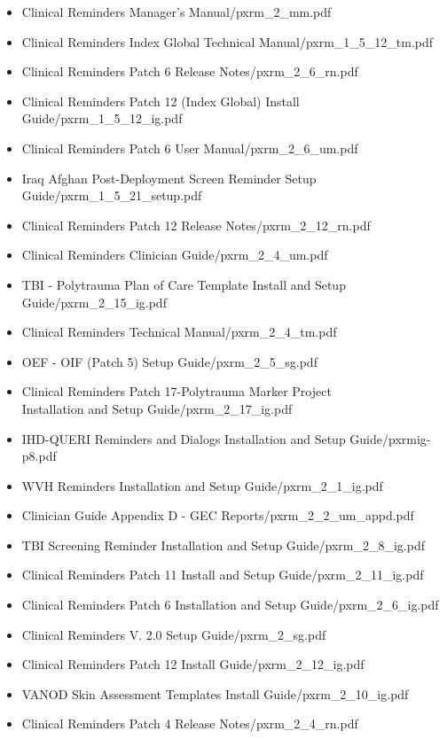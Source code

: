 \documentclass{OSEHRAArticle}
\begin{document}
\begin{itemize}
\item Clinical Reminders Manager's Manual/pxrm\_2\_mm.pdf
\item Clinical Reminders Index Global Technical Manual/pxrm\_1\_5\_12\_tm.pdf
\item Clinical Reminders Patch 6 Release Notes/pxrm\_2\_6\_rn.pdf
\item Clinical Reminders Patch 12 (Index Global) Install Guide/pxrm\_1\_5\_12\_ig.pdf
\item Clinical Reminders Patch 6 User Manual/pxrm\_2\_6\_um.pdf
\item Iraq  Afghan Post-Deployment Screen Reminder Setup Guide/pxrm\_1\_5\_21\_setup.pdf
\item Clinical Reminders Patch 12 Release Notes/pxrm\_2\_12\_rn.pdf
\item Clinical Reminders Clinician Guide/pxrm\_2\_4\_um.pdf
\item TBI - Polytrauma Plan of Care Template Install and Setup Guide/pxrm\_2\_15\_ig.pdf
\item Clinical Reminders Technical Manual/pxrm\_2\_4\_tm.pdf
\item OEF - OIF (Patch 5) Setup Guide/pxrm\_2\_5\_sg.pdf
\item Clinical Reminders Patch 17-Polytrauma Marker Project \\Installation and Setup Guide/pxrm\_2\_17\_ig.pdf
\item IHD-QUERI Reminders and Dialogs Installation and Setup Guide/pxrmig-p8.pdf
\item WVH Reminders Installation and Setup Guide/pxrm\_2\_1\_ig.pdf
\item Clinician Guide Appendix D - GEC Reports/pxrm\_2\_2\_um\_appd.pdf
\item TBI Screening Reminder Installation and Setup Guide/pxrm\_2\_8\_ig.pdf
\item Clinical Reminders Patch 11 Install and Setup Guide/pxrm\_2\_11\_ig.pdf
\item Clinical Reminders Patch 6 Installation and Setup Guide/pxrm\_2\_6\_ig.pdf
\item Clinical Reminders V. 2.0 Setup Guide/pxrm\_2\_sg.pdf
\item Clinical Reminders Patch 12 Install Guide/pxrm\_2\_12\_ig.pdf
\item VANOD Skin Assessment Templates Install Guide/pxrm\_2\_10\_ig.pdf
\item Clinical Reminders Patch 4 Release Notes/pxrm\_2\_4\_rn.pdf
\end{itemize}
\end{document}
